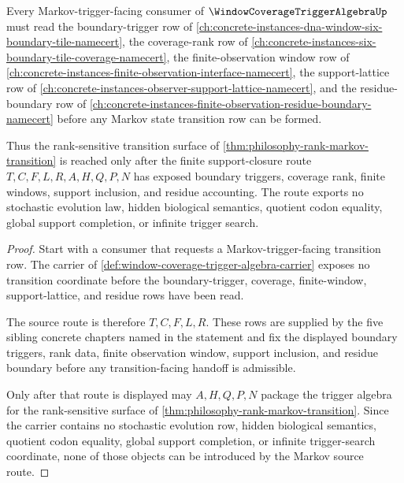 \begin{theorem}
\label{thm:window-coverage-trigger-algebra-markov-source-route}
Every Markov-trigger-facing consumer of $\WindowCoverageTriggerAlgebraUp$ must read the boundary-trigger row of \autoref{ch:concrete-instances-dna-window-six-boundary-tile-namecert}, the coverage-rank row of \autoref{ch:concrete-instances-six-boundary-tile-coverage-namecert}, the finite-observation window row of \autoref{ch:concrete-instances-finite-observation-interface-namecert}, the support-lattice row of \autoref{ch:concrete-instances-observer-support-lattice-namecert}, and the residue-boundary row of \autoref{ch:concrete-instances-finite-observation-residue-boundary-namecert} before any Markov state transition row can be formed.

Thus the rank-sensitive transition surface of \autoref{thm:philosophy-rank-markov-transition} is reached only after the finite support-closure route $T,C,F,L,R,A,H,Q,P,N$ has exposed boundary triggers, coverage rank, finite windows, support inclusion, and residue accounting. The route exports no stochastic evolution law, hidden biological semantics, quotient codon equality, global support completion, or infinite trigger search.
\end{theorem}
\begin{proof}
Start with a consumer that requests a Markov-trigger-facing transition row. The carrier of \autoref{def:window-coverage-trigger-algebra-carrier} exposes no transition coordinate before the boundary-trigger, coverage, finite-window, support-lattice, and residue rows have been read.

The source route is therefore $T,C,F,L,R$. These rows are supplied by the five sibling concrete chapters named in the statement and fix the displayed boundary triggers, rank data, finite observation window, support inclusion, and residue boundary before any transition-facing handoff is admissible.

Only after that route is displayed may $A,H,Q,P,N$ package the trigger algebra for the rank-sensitive surface of \autoref{thm:philosophy-rank-markov-transition}. Since the carrier contains no stochastic evolution row, hidden biological semantics, quotient codon equality, global support completion, or infinite trigger-search coordinate, none of those objects can be introduced by the Markov source route.
\end{proof}


